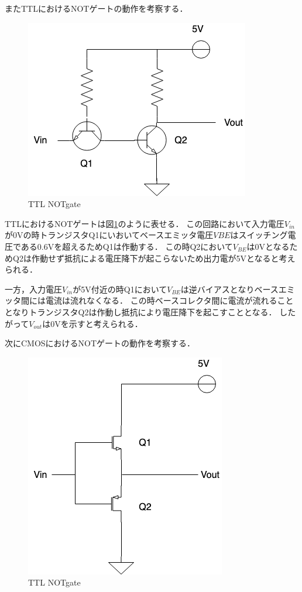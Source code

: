 \documentclass[11pt, a4paper,twocolumn]{jarticle}
\begin{document}
またTTLにおけるNOTゲートの動作を考察する．
\begin{figure}[htbp]
 \begin{center}
  \includegraphics[width=0.7\linewidth]{fig6.png}
 \end{center}
 \caption{TTL NOTgate}
 \label{fig:6}
\end{figure}

TTLにおけるNOTゲートは図\ref{fig:6}のように表せる．
この回路において入力電圧$V_{in}$が0Vの時トランジスタQ1にいおいてベースエミッタ電圧$V{BE}$はスイッチング電圧である0.6Vを超えるためQ1は作動する．
この時Q2において$V_{BE}$は0VとなるためQ2は作動せず抵抗による電圧降下が起こらないため出力電が5Vとなると考えられる．

一方，入力電圧$V_{in}$が5V付近の時Q1において$V_{BE}$は逆バイアスとなりベースエミッタ間には電流は流れなくなる．
この時ベースコレクタ間に電流が流れることとなりトランジスタQ2は作動し抵抗により電圧降下を起こすこととなる．
したがって$V_{out}$は0Vを示すと考えられる．

次にCMOSにおけるNOTゲートの動作を考察する．
\begin{figure}[htbp]
 \begin{center}
  \includegraphics[width=0.7\linewidth]{fig7.png}
 \end{center}
 \caption{TTL NOTgate}
 \label{fig:7}
\end{figure}
\end{document}
